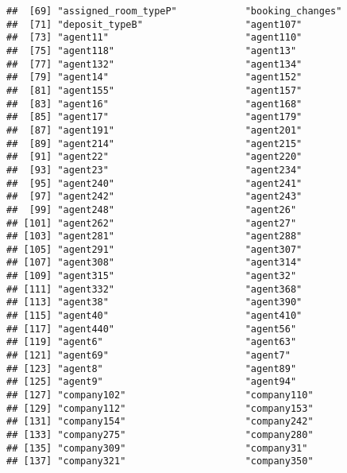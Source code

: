 \documentclass[
]{book}
\begin{document}
\begin{verbatim}
##  [69] "assigned_room_typeP"            "booking_changes"               
##  [71] "deposit_typeB"                  "agent107"                      
##  [73] "agent11"                        "agent110"                      
##  [75] "agent118"                       "agent13"                       
##  [77] "agent132"                       "agent134"                      
##  [79] "agent14"                        "agent152"                      
##  [81] "agent155"                       "agent157"                      
##  [83] "agent16"                        "agent168"                      
##  [85] "agent17"                        "agent179"                      
##  [87] "agent191"                       "agent201"                      
##  [89] "agent214"                       "agent215"                      
##  [91] "agent22"                        "agent220"                      
##  [93] "agent23"                        "agent234"                      
##  [95] "agent240"                       "agent241"                      
##  [97] "agent242"                       "agent243"                      
##  [99] "agent248"                       "agent26"                       
## [101] "agent262"                       "agent27"                       
## [103] "agent281"                       "agent288"                      
## [105] "agent291"                       "agent307"                      
## [107] "agent308"                       "agent314"                      
## [109] "agent315"                       "agent32"                       
## [111] "agent332"                       "agent368"                      
## [113] "agent38"                        "agent390"                      
## [115] "agent40"                        "agent410"                      
## [117] "agent440"                       "agent56"                       
## [119] "agent6"                         "agent63"                       
## [121] "agent69"                        "agent7"                        
## [123] "agent8"                         "agent89"                       
## [125] "agent9"                         "agent94"                       
## [127] "company102"                     "company110"                    
## [129] "company112"                     "company153"                    
## [131] "company154"                     "company242"                    
## [133] "company275"                     "company280"                    
## [135] "company309"                     "company31"                     
## [137] "company321"                     "company350"                    

\end{verbatim}
\end{document}
